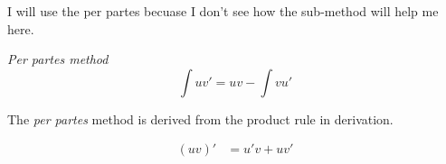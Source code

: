 I will use the per partes becuase 
I don't see how the sub-method will 
help me here.

\begin{center}
    \textit{Per partes method}
    $$ \int uv' = uv - \int vu' $$
\end{center}

The \textit{per partes} method is derived 
from the product rule in derivation. 

\begin{align*}
    (uv)' &= u'v + uv' \\
\end{align*}